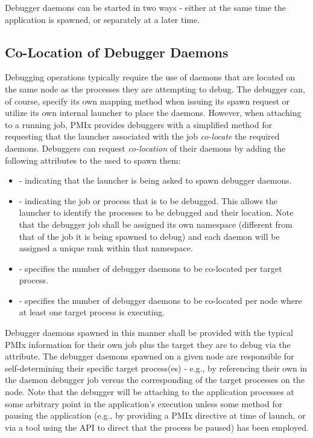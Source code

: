 Debugger daemons can be started in two ways - either at the same time the application is spawned, or separately at a later time.

\subsection{Co-Location of Debugger Daemons}
\label{chap:api_tools:colocate}

Debugging operations typically require the use of daemons that are located on
the same node as the processes they are attempting to debug. The debugger can,
of course, specify its own mapping method when issuing its spawn request or
utilize its own internal launcher to place the daemons. However, when attaching
to a running job, \ac{PMIx} provides debuggers with a simplified method for
requesting that the launcher associated with the job \emph{co-locate} the
required daemons. Debuggers can request \emph{co-location} of their daemons by
adding the following attributes to the  used to spawn them:

\begin{itemize}
    \item {} - indicating that the launcher is
    being asked to spawn debugger daemons.
    \item {} - indicating the job or process that is
    to be debugged. This allows the launcher to identify the processes to be
    debugged and their location. Note that the debugger job shall be assigned
    its own namespace (different from that of the job it is being spawned
    to debug) and each daemon will be assigned a unique rank within that
    namespace.
    \item {} - specifies the number of
    debugger daemons to be co-located per target process.
    \item {} - specifies the number of
    debugger daemons to be co-located per node where at least one target
    process is executing.
\end{itemize}

Debugger daemons spawned in this manner shall be provided with the typical
\ac{PMIx} information for their own job plus the target they are to debug via
the  attribute. The debugger daemons spawned on a
given node are responsible for self-determining their specific target
process(es) - e.g., by referencing their own  in the
daemon debugger job versus the corresponding  of the
target processes on the node. Note that the debugger will be attaching to the application processes
at some arbitrary point in the application's execution unless some method for pausing the application
(e.g., by providing a \ac{PMIx} directive at time of launch, or via a tool using the
 \ac{API} to direct that the process be paused) has been employed.

